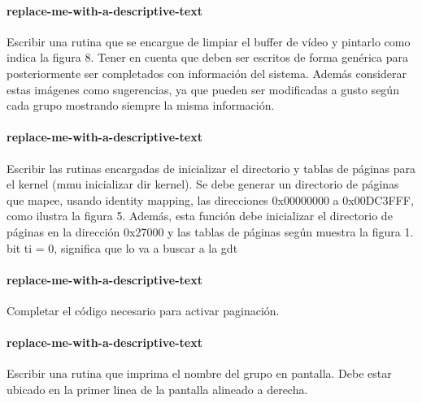 \paragraph{replace-me-with-a-descriptive-text}\label{subsubsec:ej3-a}
Escribir una rutina que se encargue de limpiar el buffer de vídeo y pintarlo
como indica la figura 8. Tener en cuenta que deben ser escritos de forma
genérica para posteriormente ser completados con información del sistema. Además
considerar estas imágenes como sugerencias, ya que pueden ser modificadas a
gusto según cada grupo mostrando siempre la misma información.
\hruler
{}

\paragraph{replace-me-with-a-descriptive-text}\label{subsubsec:ej3-b}
Escribir las rutinas encargadas de inicializar el directorio y tablas de páginas
para el kernel (mmu inicializar dir kernel). Se debe generar un directorio de
páginas que mapee, usando identity mapping, las direcciones 0x00000000 a
0x00DC3FFF, como ilustra la figura 5. Además, esta función debe inicializar el
directorio de páginas en la dirección 0x27000 y las tablas de páginas según
muestra la figura 1.
\hruler
{}
bit ti = 0, significa que lo va a buscar a la gdt

\paragraph{replace-me-with-a-descriptive-text}\label{subsubsec:ej3-c}
Completar el código necesario para activar paginación.
\hruler
{}

\paragraph{replace-me-with-a-descriptive-text}\label{subsubsec:ej3-d}
Escribir una rutina que imprima el nombre del grupo en pantalla. Debe estar
ubicado en la primer linea de la pantalla alineado a derecha.
\hruler
{}
